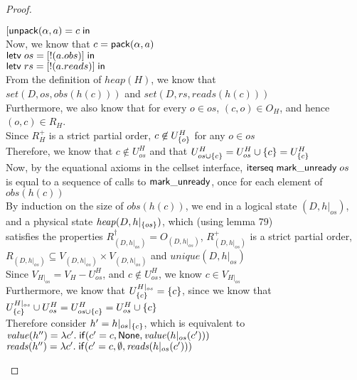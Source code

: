 \begin{proof}
\begin{tabbedproof}
\oooo $[\mathsf{unpack}({\alpha}, {a}) = {c} \;\mathsf{in}\;{}$ \\
\oooo Now, we know that $c = \mathsf{pack}({\alpha}, {a})$ \\
\oooo $\mathsf{letv}\;os = [!(a.obs)]\;\mathsf{in}\;$ \\
\oooo $\mathsf{letv}\;rs = [!(a.reads)]\;\mathsf{in}\;$ \\
\oooo From the definition of $\mathit{heap}(H)$, we know that  \\
\oooo $\mathit{set}(D, os, \mathit{obs}(h(c)))$ and $\mathit{set}(D, rs, \mathit{reads}(h(c)))$ \\
\oooo Furthermore, we also know that for every $o \in os$, $(c, o) \in O_H$, and hence $(o, c) \in R_H$. \\
\oooo Since $R^+_H$ is a strict partial order, $c \not \in U^H_{\{{o}\}}$ for any $o \in os$ \\
\oooo Therefore, we know that $c \not\in U^H_{os}$ and that $U^H_{os \cup \{{c}\}} = U^H_{os} \cup \{{c}\} = U^H_{\{{c}\}}$ \\
\oooo Now, by the equational axioms in the cellset interface, $\mathsf{iterseq\;mark\_unready}\;os$ \\
\ooox is equal to a sequence of calls to $\mathsf{mark\_unready}$, once for each element of $\mathit{obs}(h(c))$\\
\oooo By induction on the size of $\mathit{obs}(h(c))$, we end in a logical state $(D, h|_{os})$, \\
\ooox and a physical state $\mathit{heap}(D, h|_{\{{os}\}})$, which (using lemma 79)  \\
\ooox satisfies the properties $R^\dagger_{(D,h|_{os})} = O_{(D,h|_{os})}$, $R^+_{(D,h|_{os})}$ is a strict partial order, \\
\ooox $R_{(D,h|_{os})} \subseteq V_{(D,h|_{os})} \times V_{(D,h|_{os})}$ and $\mathit{unique}(D,h|_{os})$ \\
\oooo Since $V_{H|_{os}} = V_H - U^H_{os}$, and $c \not \in U^H_{os}$, we know $c \in V_{H|_{os}}$ \\ 
\oooo Furthermore, we know that $U^{H|_{os}}_{\{{c}\}} = \{{c}\}$, since we know that \\
\oooox $U^{H|_{os}}_{\{{c}\}} \cup U^H_{os} = U^H_{os \cup \{{c}\}} = U^H_{os} \cup \{{c}\}$ \\
\oooo Therefore consider $h' = h|_{os}|_{\{{c}\}}$, which is equivalent to  \\
\oooox $\mathit{value}(h'') = \lambda c'.\;\mathsf{if}({c' = c}, {\mathsf{None}}, {\mathit{value}(h|_{os}(c'))})$ \\
\oooox $\mathit{reads}(h'') = \lambda c'.\;\mathsf{if}({c' = c}, {\emptyset}, {\mathit{reads}(h|_{os}(c'))})$ \\

\end{tabbedproof}
\end{proof}
